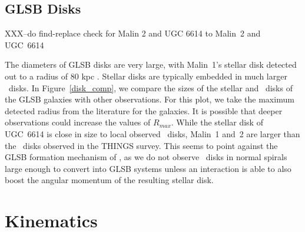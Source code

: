 \documentclass{emulateapj}
\newcommand\HI{\ion{H}{1}}
\begin{document}
\subsection{GLSB Disks}\label{sec:disks}

XXX--do find-replace check for Malin 2 and UGC 6614 to Malin~2 and UGC~6614



The diameters of GLSB disks are very large, with Malin~1's stellar disk detected out to a radius of 80 kpc \citep{Galaz15}.  Stellar disks are typically embedded in much larger \HI\ disks.  In Figure~\ref{disk_comp}, we compare the sizes of the stellar and \HI\ disks of the GLSB galaxies with other observations.  For this plot, we take the maximum detected radius from the literature for the galaxies.  It is possible that deeper observations could increase the values of $R_{max}$.  While the stellar disk of UGC~6614 is close in size to local observed \HI\ disks, Malin~1 and~2 are larger than the \HI\ disks observed in the THINGS survey.  This seems to point against the GLSB formation mechanism of \citet{Mapelli08}, as we do not observe \HI\ disks in normal spirals large enough to convert into GLSB systems unless an interaction is able to also boost the angular momentum of the resulting stellar disk.

\begin{figure*}
\caption{ Comparison of the GLSB disks with other galaxy disks from the literature.  THINGS data taken from \citet{DeBlok2008}, GLSB \HI\ data from Malin 1 from \citet{Pickering97} and GLSB stellar radii from \citet{Galaz15}, \citet{Kasparova14}, and this paper.  Here, $R_{max}$ is the maximum radius with an \HI\ or optical detection.  For the GLSB galaxies, the circular points show the maximum \HI\ detection radius and stars-shaped points show the maximum detected stellar light radius.  All points are maximum detection radii, and thus should be considered lower limits.   \label{disk_comp}}
\end{figure*}


\section{Kinematics}\label{sec:kinematics}
\end{document}
